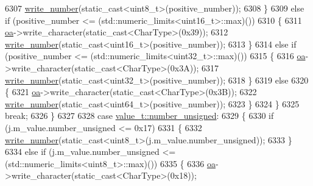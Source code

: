\begin{DoxyCode}
6307                         \hyperlink{classnlohmann_1_1detail_1_1binary__writer_a62cfd50a511371e718f37ad7bb29ae9d}{write\_number}(static\_cast<uint8\_t>(positive\_number));
6308                     \}
6309                     \textcolor{keywordflow}{else} \textcolor{keywordflow}{if} (positive\_number <= (std::numeric\_limits<uint16\_t>::max)())
6310                     \{
6311                         \hyperlink{classnlohmann_1_1detail_1_1binary__writer_a6f15b782a7900f50ef37d123008e601b}{oa}->write\_character(static\_cast<CharType>(0x39));
6312                         \hyperlink{classnlohmann_1_1detail_1_1binary__writer_a62cfd50a511371e718f37ad7bb29ae9d}{write\_number}(static\_cast<uint16\_t>(positive\_number));
6313                     \}
6314                     \textcolor{keywordflow}{else} \textcolor{keywordflow}{if} (positive\_number <= (std::numeric\_limits<uint32\_t>::max)())
6315                     \{
6316                         \hyperlink{classnlohmann_1_1detail_1_1binary__writer_a6f15b782a7900f50ef37d123008e601b}{oa}->write\_character(static\_cast<CharType>(0x3A));
6317                         \hyperlink{classnlohmann_1_1detail_1_1binary__writer_a62cfd50a511371e718f37ad7bb29ae9d}{write\_number}(static\_cast<uint32\_t>(positive\_number));
6318                     \}
6319                     \textcolor{keywordflow}{else}
6320                     \{
6321                         \hyperlink{classnlohmann_1_1detail_1_1binary__writer_a6f15b782a7900f50ef37d123008e601b}{oa}->write\_character(static\_cast<CharType>(0x3B));
6322                         \hyperlink{classnlohmann_1_1detail_1_1binary__writer_a62cfd50a511371e718f37ad7bb29ae9d}{write\_number}(static\_cast<uint64\_t>(positive\_number));
6323                     \}
6324                 \}
6325                 \textcolor{keywordflow}{break};
6326             \}
6327 
6328             \textcolor{keywordflow}{case} \hyperlink{namespacenlohmann_1_1detail_a1ed8fc6239da25abcaf681d30ace4985adce7cc8ec29055c4158828921f2f265e}{value\_t::number\_unsigned}:
6329             \{
6330                 \textcolor{keywordflow}{if} (j.m\_value.number\_unsigned <= 0x17)
6331                 \{
6332                     \hyperlink{classnlohmann_1_1detail_1_1binary__writer_a62cfd50a511371e718f37ad7bb29ae9d}{write\_number}(static\_cast<uint8\_t>(j.m\_value.number\_unsigned));
6333                 \}
6334                 \textcolor{keywordflow}{else} \textcolor{keywordflow}{if} (j.m\_value.number\_unsigned <= (std::numeric\_limits<uint8\_t>::max)())
6335                 \{
6336                     \hyperlink{classnlohmann_1_1detail_1_1binary__writer_a6f15b782a7900f50ef37d123008e601b}{oa}->write\_character(static\_cast<CharType>(0x18));

\end{DoxyCode}
